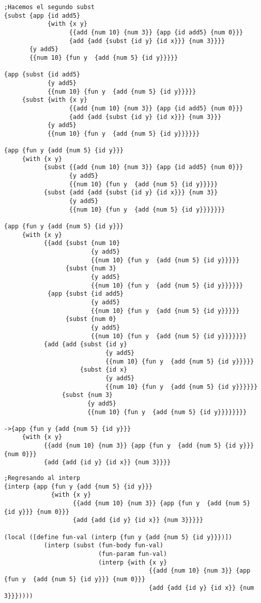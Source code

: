 \documentclass[a4paper]{article}
\begin{document}
\begin{verbatim}
;Hacemos el segundo subst
{subst {app {id add5}
            {with {x y}
                  {{add {num 10} {num 3}} {app {id add5} {num 0}}}
                  {add {add {subst {id y} {id x}}} {num 3}}}}
       {y add5}
       {{num 10} {fun y  {add {num 5} {id y}}}}}

{app {subst {id add5}
            {y add5}
            {{num 10} {fun y  {add {num 5} {id y}}}}}
     {subst {with {x y}
                  {{add {num 10} {num 3}} {app {id add5} {num 0}}}
                  {add {add {subst {id y} {id x}}} {num 3}}}
            {y add5}
            {{num 10} {fun y  {add {num 5} {id y}}}}}}

{app {fun y {add {num 5} {id y}}}
     {with {x y}
           {subst {{add {num 10} {num 3}} {app {id add5} {num 0}}}
                  {y add5}
                  {{num 10} {fun y  {add {num 5} {id y}}}}}
           {subst {add {add {subst {id y} {id x}}} {num 3}}
                  {y add5}
                  {{num 10} {fun y  {add {num 5} {id y}}}}}}}

{app {fun y {add {num 5} {id y}}}
     {with {x y}
           {{add {subst {num 10}
                        {y add5}
                        {{num 10} {fun y  {add {num 5} {id y}}}}}
                 {subst {num 3}
                        {y add5}
                        {{num 10} {fun y  {add {num 5} {id y}}}}}}
            {app {subst {id add5}
                        {y add5}
                        {{num 10} {fun y  {add {num 5} {id y}}}}}
                 {subst {num 0}
                        {y add5}
                        {{num 10} {fun y  {add {num 5} {id y}}}}}}}
           {add {add {subst {id y}
                            {y add5}
                            {{num 10} {fun y  {add {num 5} {id y}}}}}
                     {subst {id x}
                            {y add5}
                            {{num 10} {fun y  {add {num 5} {id y}}}}}}
                {subst {num 3}
                       {y add5}
                       {{num 10} {fun y  {add {num 5} {id y}}}}}}}}

->{app {fun y {add {num 5} {id y}}}
     {with {x y}
           {{add {num 10} {num 3}} {app {fun y  {add {num 5} {id y}}} {num 0}}}
           {add {add {id y} {id x}} {num 3}}}}
\end{verbatim}
\color{black}
\begin{verbatim}
;Regresando al interp
{interp {app {fun y {add {num 5} {id y}}}
             {with {x y}
                   {{add {num 10} {num 3}} {app {fun y  {add {num 5} {id y}}} {num 0}}}
                   {add {add {id y} {id x}} {num 3}}}}}

(local ([define fun-val (interp {fun y {add {num 5} {id y}}})])
           (interp (subst (fun-body fun-val)
                          (fun-param fun-val)
                          (interp {with {x y}
                                        {{add {num 10} {num 3}} {app {fun y  {add {num 5} {id y}}} {num 0}}}
                                        {add {add {id y} {id x}} {num 3}}}))))
\end{verbatim}
\end{document}
